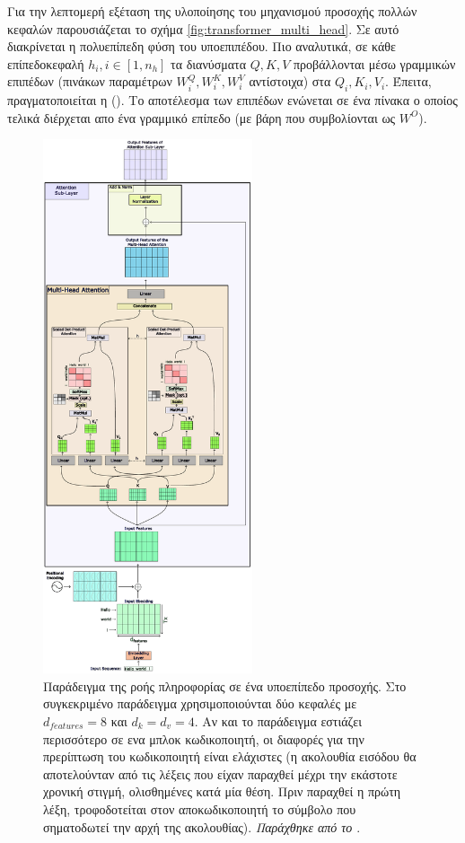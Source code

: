 Για την λεπτομερή εξέταση της υλοποίησης του μηχανισμού προσοχής πολλών κεφαλών παρουσιάζεται το σχήμα \ref{fig:transformer_multi_head}. Σε αυτό διακρίνεται η πολυεπίπεδη φύση του υπο\textendash επιπέδου. Πιο αναλυτικά, σε κάθε επίπεδο\textemdash κεφαλή $h_i, i \in [1,n_h]$ τα διανύσματα $Q, K, V$ προβάλλονται μέσω γραμμικών επιπέδων (πινάκων παραμέτρων $W_i^Q, W_i^K, W_i^V$ αντίστοιχα) στα $Q_i, K_i, V_i$. Έπειτα, πραγματοποιείται η  (). Το αποτέλεσμα των επιπέδων ενώνεται σε ένα πίνακα ο οποίος τελικά διέρχεται απο ένα γραμμικό επίπεδο (με βάρη που συμβολίονται ως $W^O$). \par

\begin{figure}[p]
  \centering
  \includegraphics[width=0.55\textwidth]{images/chapter theoritical background/transformer_flow.pdf}
  \caption{Παράδειγμα της ροής πληροφορίας σε ένα υπο\textendash επίπεδο προσοχής. Στο συγκεκριμένο παράδειγμα χρησιμοποιούνται δύο κεφαλές με $d_{features} = 8$ και $d_k=d_v=4$. Αν και το παράδειγμα εστιάζει περισσότερο σε ενα μπλοκ κωδικοποιητή, οι διαφορές για την πρερίπτωση του κωδικοποιητή είναι ελάχιστες (η ακολουθία εισόδου θα αποτελούνταν από τις λέξεις που είχαν παραχθεί μέχρι την εκάστοτε χρονική στιγμή, ολισθημένες κατά μία θέση. Πριν παραχθεί η πρώτη λέξη, τροφοδοτείται στον αποκωδικοποιητή το σύμβολο  που σηματοδωτεί την αρχή της ακολουθίας). \textit{Παράχθηκε από το \href{https://inkscape.org/}{}}.}
  \label{fig:transformer_flow}
\end{figure}

